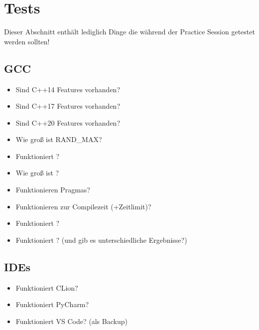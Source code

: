 \section{Tests}
Dieser Abschnitt enthält lediglich Dinge die während der Practice Session getestet werden sollten!

\subsection{GCC}
\begin{itemize}
	\item Sind C++14 Features vorhanden?
	\item Sind C++17 Features vorhanden?
	\item Sind C++20 Features vorhanden?
	\item Wie groß ist RAND\_MAX?
	\item Funktioniert ?
	\item Wie groß ist ?
	\item Funktionieren Pragmas?
	\item Funktionieren  zur Compilezeit (+Zeitlimit)?
	\item Funktioniert ?
	\item Funktioniert ? (und gib es unterschiedliche Ergebnisse?)
\end{itemize}


\subsection{IDEs}
\begin{itemize}
	\item Funktioniert CLion?
	\item Funktioniert PyCharm?
	\item Funktioniert VS Code? (als Backup)
\end{itemize}

